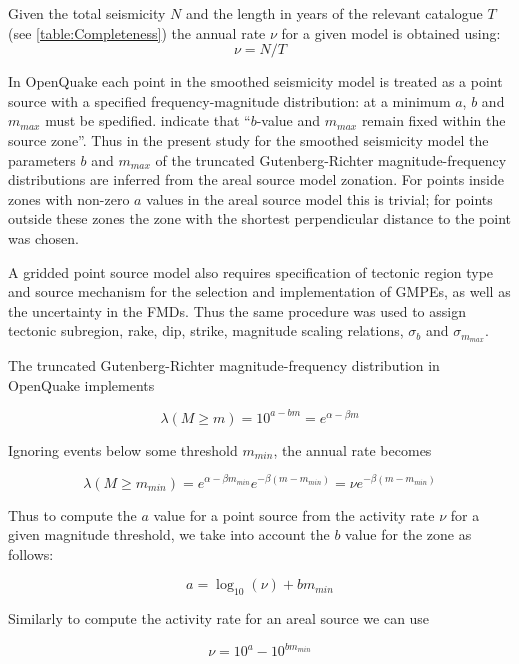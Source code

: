 \documentclass{article}
\begin{document}
Given the total seismicity $N$ and the length in years of the relevant catalogue $T$ (see \autoref{table:Completeness}) the annual rate $\nu$ for a given model is obtained using:
\begin{equation} \label{eq:SeismicityToActivity} 
\nu = N/T 
\end{equation}

In OpenQuake each point in the smoothed seismicity model is treated as a point source with a specified frequency-magnitude distribution: at a minimum $a$, $b$ and $m_{max}$ must be spedified.
\cite{nath2012probabilistic} indicate that ``$b$-value and $m_{max}$ remain fixed within the source zone''.
Thus in the present study for the smoothed seismicity model the parameters $b$ and $m_{max}$ of the truncated Gutenberg-Richter magnitude-frequency distributions are inferred from the areal source model zonation.
For points inside zones with non-zero $a$ values in the areal source model this is trivial; for points outside these zones the zone with the shortest perpendicular distance to the point was chosen.

A gridded point source model also requires specification of  tectonic region type and source mechanism for the selection and implementation of GMPEs, as well as the uncertainty in the FMDs.
Thus the same procedure was used to assign tectonic subregion, rake, dip, strike, magnitude scaling relations, $\sigma_b$ and $\sigma_{m_{max}}$.

The truncated Gutenberg-Richter magnitude-frequency distribution in OpenQuake implements

$$ \lambda(M \geq m) = 10^{a - b m} = e^{\alpha - \beta m} $$

Ignoring events below some threshold $m_{min}$, the annual rate becomes

$$ \lambda(M \geq m_{min}) = e^{\alpha - \beta m_{min}} e^{-\beta (m - m_{min})} = \nu e^{-\beta (m - m_{min})} $$

Thus to compute the $a$ value for a point source from the activity rate $\nu$ for a given magnitude threshold, we take into account the $b$ value for the zone as follows:

$$a = \log_{10}(\nu) + b m_{min} $$

Similarly to compute the activity rate for an areal source we can use

\begin{equation} \label{eq:ArealActivity} 
\nu = 10^a - 10^{b m_{min}}
\end{equation}
\end{document}
